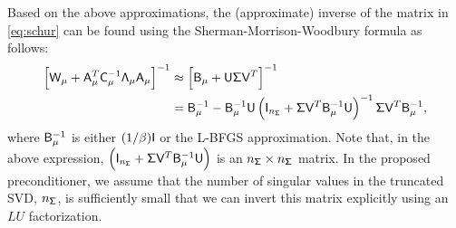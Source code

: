 

Based on the above approximations, the (approximate) inverse of the matrix in
\eqref{eq:schur} can be found using the Sherman-Morrison-Woodbury formula as follows:
\begin{align}
\left[\mathsf{W}_\mu + \mathsf{A}_\mu^T \mathsf{C}_\mu^{-1}  \mathsf{\Lambda}_\mu  \mathsf{A}_\mu \right]^{-1}
&\approx
\left[\mathsf{B}_{\mu} + \mathsf{U} \mathsf{\Sigma} \mathsf{V}^T \right]^{-1} \notag \\
&= \mathsf{B}_\mu^{-1} - \mathsf{B}_\mu^{-1} \mathsf{U}  \left(  \mathsf{I}_{n_{\mathsf{\Sigma}}} +  \mathsf{\Sigma} \mathsf{V}^{T} \mathsf{B}_\mu^{-1} 
\mathsf{U} \right)^{-1} \mathsf{\Sigma} \mathsf{V}^{T} \mathsf{B}_\mu^{-1},
\label{eq:smw}
\end{align}
where $\mathsf{B}_\mu^{-1}$ is either $(1/\beta)\mathsf{I}$ or the L-BFGS
approximation.  Note that, in the above expression, $\left(\mathsf{I}_{n_{\mathsf{\Sigma}}} +
\mathsf{\Sigma} \mathsf{V}^{T} \mathsf{B}_{\mu}^{-1} \mathsf{U} \right)$ is an $n_{\mathsf{\Sigma}}\times
n_{\mathsf{\Sigma}}$ matrix.  In the proposed preconditioner, we assume that the number of
singular values in the truncated SVD, \ie $n_{\mathsf{\Sigma}}$, is sufficiently small that we
can invert this matrix explicitly using an $LU$ factorization.

